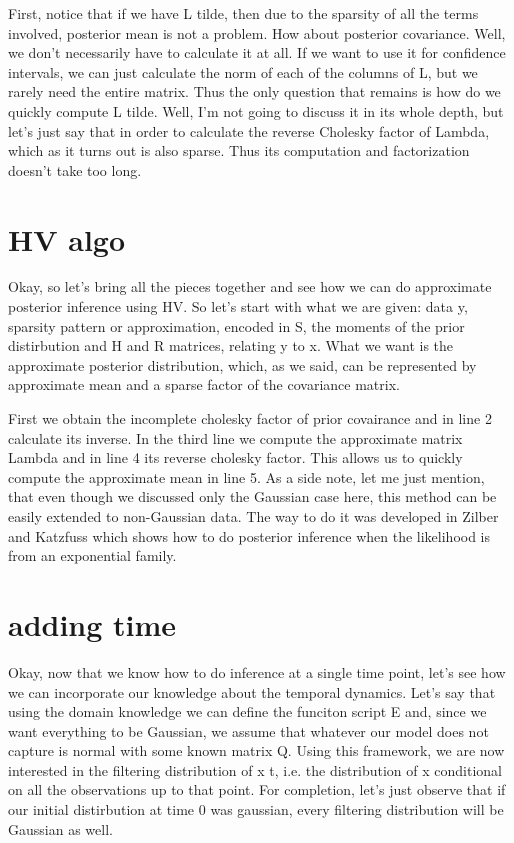 \documentclass[14pt]{extarticle} %
\begin{document}
First, notice that if we have L tilde, then due to the sparsity of all the terms involved, posterior mean is not a problem. How about posterior covariance. Well, we don't necessarily have to calculate it at all. If we want to use it for confidence intervals, we can just calculate the norm of each of the columns of L, but we rarely need the entire matrix. Thus the only question that remains is how do we quickly compute L tilde. Well, I'm not going to discuss it in its whole depth, but let's just say that in order to calculate the reverse Cholesky factor of Lambda, which as it turns out is also sparse. Thus its computation and factorization doesn't take too long.



\newpage
\section*{HV algo}


Okay, so let's bring all the pieces together and see how we can do approximate posterior inference using HV. So let's start with what we are given: data y, sparsity pattern or approximation, encoded in S, the moments of the prior distirbution and H and R matrices, relating y to x. What we want is the approximate posterior distribution, which, as we said, can be represented by approximate mean and a sparse factor of the covariance matrix.

First we obtain the incomplete cholesky factor of prior covairance and in line 2 calculate its inverse. In the third line we compute the approximate matrix Lambda and in line 4 its reverse cholesky factor. This allows us to quickly compute the approximate mean in line 5. As a side note, let me just mention, that even though we discussed only the Gaussian case here, this method can be easily extended to non-Gaussian data. The way to do it was developed in Zilber and Katzfuss which shows how to do posterior inference when the likelihood is from an exponential family.



\newpage
\section*{adding time}




Okay, now that we know how to do inference at a single time point, let's see how we can incorporate our knowledge about the temporal dynamics. Let's say that using the domain knowledge we can define the funciton script E and, since we want everything to be Gaussian, we assume that whatever our model does not capture is normal with some known matrix Q. Using this framework, we are now interested in the filtering distribution of x t, i.e. the distribution of x conditional on all the observations up to that point. For completion, let's just observe that if our initial distirbution at time 0 was gaussian, every filtering distribution will be Gaussian as well. 
\end{document}
